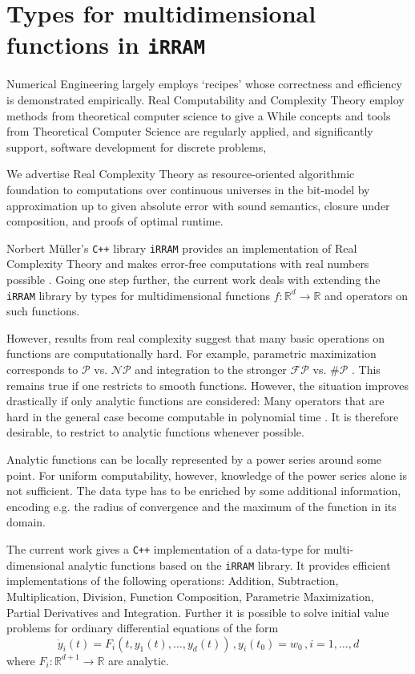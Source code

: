 \documentclass{article}
\newcommand{\RR}{\mathbb R}
\newcommand{\p}{\ensuremath{\mathcal P}\xspace}
\newcommand{\np}{\ensuremath{\mathcal{NP}}\xspace}
\newcommand{\fp}{\ensuremath{\mathcal{FP}}\xspace}
\newcommand{\sharpp}{\ensuremath{\# \mathcal{P}}\xspace}
\newcommand{\cc}{\texttt{C++}\xspace}
\newcommand{\irram}{\texttt{iRRAM}\xspace}
\begin{document}
\section*{Types for multidimensional functions in \irram}
Numerical Engineering largely employs `recipes' whose correctness and efficiency is demonstrated empirically.
Real Computability and Complexity Theory employ methods from theoretical computer science to give a
While concepts and tools from Theoretical Computer Science are regularly applied,
and significantly support, software development for discrete problems,

We advertise Real Complexity Theory as resource-oriented algorithmic foundation to computations over continuous universes in the bit-model by approximation up to given absolute error with sound semantics,
closure under composition, and proofs of optimal runtime.

Norbert Müller's \cc library \irram provides an implementation of Real Complexity Theory and makes error-free computations with real numbers possible \cite{Mueller00}.
Going one step further, the current work deals with extending the \irram library by types for multidimensional functions $f: \RR^d \to \RR$ and operators on such functions.

However, results from real complexity suggest that many basic operations on functions are computationally hard. 
For example, parametric maximization corresponds to $\p$ vs. $\np$ \cite{MR666209} and integration to the stronger $\fp$ vs. $\sharpp$ \cite{MR748898}.
This remains true if one restricts to smooth functions.
However, the situation improves drastically if only analytic functions are considered: Many operators that are hard in the general case become computable in polynomial time \cite{Kawamura2012}.
It is therefore desirable, to restrict to analytic functions whenever possible.

Analytic functions can be locally represented by a power series around some point.
For uniform computability, however, knowledge of the power series alone is not sufficient.
The data type has to be enriched by some additional information, encoding e.g. the radius of convergence and the maximum of the function in its domain.

The current work gives a \cc implementation of a data-type for multi-dimensional analytic functions based on the \irram library.
It provides efficient implementations of the following operations: Addition, Subtraction, Multiplication, Division, Function Composition, Parametric Maximization, Partial Derivatives and Integration.
Further it is possible to solve initial value problems for ordinary differential equations of the form
$$ \dot y_i(t) = F_i(t, y_1(t), \dots, y_d(t))\, , y_i(t_0) = w_0\, , i = 1, \dots, d$$
where $F_i : \RR^{d+1} \to \RR$ are analytic.


{}
\end{document}
